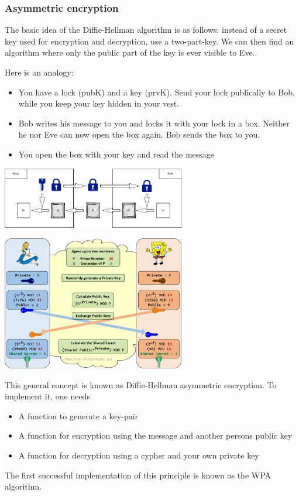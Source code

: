 \subsubsection{Asymmetric encryption}

The basic idea of the Diffie-Hellman algorithm is as follows: instead of a secret key used for encryption and decryption, use a two-part-key. We can then find an algorithm where only the public part of the key is ever visible to Eve. 

Here is an analogy:
\begin{itemize}
	\item You have a lock (pubK) and a key (prvK). Send your lock publically to Bob, while you keep your key hidden in your vest. 
	\item Bob writes his message to you and locks it with your lock in a box. Neither he nor Eve can now open the box again. Bob sends the box to you.
	\item You open the box with your key and read the message
\end{itemize}

\includegraphics[width=0.6\textwidth]{images/async} 

\includegraphics[width=0.6\textwidth]{images/diffie_hellmann} 

This general concept is known as Diffie-Hellman asymmetric encryption. To implement it, one needs 
\begin{itemize}
	\item A function to generate a key-pair
	\item A function for encryption using the message and another persons public key
	\item A function for decryption using a cypher and your own private key
\end{itemize}
The first successful implementation of this principle is known as the WPA algorithm. 

